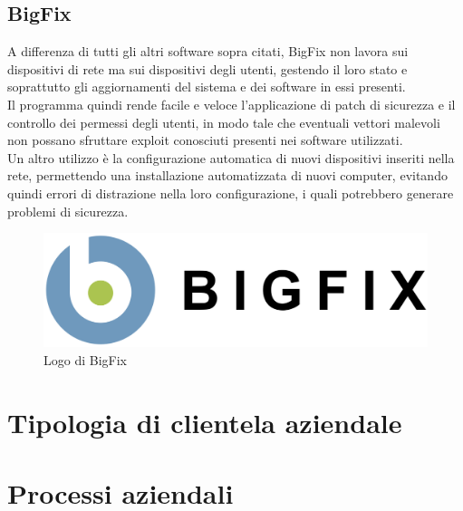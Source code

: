\documentclass[Tesi.tex]{subfiles}
\begin{document}
\subsection{BigFix}
A differenza di tutti gli altri software sopra citati, BigFix non lavora sui dispositivi di rete ma sui dispositivi degli utenti, gestendo il loro stato e soprattutto gli aggiornamenti del sistema e dei software in essi presenti. \\
Il programma quindi rende facile e veloce l'applicazione di patch di sicurezza e il controllo dei permessi degli utenti, in modo tale che eventuali vettori malevoli non possano sfruttare exploit conosciuti presenti nei software utilizzati. \\
Un altro utilizzo è la configurazione automatica di nuovi dispositivi inseriti nella rete, permettendo una installazione automatizzata di nuovi computer, evitando quindi errori di distrazione nella loro configurazione, i quali potrebbero generare problemi di sicurezza.
\begin{figure}[H]
	\centering
	\includegraphics[width=0.5\linewidth]{"images/logo/BigFix_logo"}
	\caption{Logo di BigFix}
	\label{fig:Logo di BigFix}
\end{figure}

\section{Tipologia di clientela aziendale}



\section{Processi aziendali}
\end{document}
